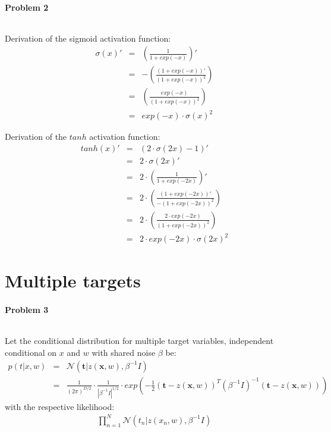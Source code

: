 \documentclass{article}
\renewcommand{\Vec}[1]{\ensuremath{\mathbf{#1}}}
\begin{document}
\paragraph*{Problem 2}
$\;$

Derivation of the sigmoid activation function:
\begin{eqnarray}
\sigma(x)' &=& \left( \frac{1}{1 + exp(-x)} \right)' \\
&=& -\left( \frac{(1 + exp(-x))'}{(1 + exp(-x))^2} \right)\\
&=& \left( \frac{exp(-x)}{(1 + exp(-x))^2} \right)\\
&=& exp(-x) \cdot \sigma(x)^2
\end{eqnarray}

Derivation of the $tanh$ activation function:
\begin{eqnarray}
tanh(x)' &=& (2 \cdot \sigma(2x) -1)'\\
&=& 2 \cdot \sigma(2x)' \\
&=& 2 \cdot \left( \frac{1}{1 + exp(-2x)} \right)' \\
&=& 2 \cdot \left( \frac{(1 + exp(-2x))'}{-(1 + exp(-2x))^2} \right)\\
&=& 2 \cdot \left( \frac{2 \cdot exp(-2x)}{(1 + exp(-2x))^2} \right)\\
&=& 2 \cdot exp(-2x) \cdot \sigma(2x)^2
\end{eqnarray}

\section{Multiple targets}

\paragraph*{Problem 3}
$\;$ 

Let the conditional distribution for multiple target variables, independent conditional on $x$ and $w$ with shared noise $\beta$ be:
\begin{eqnarray}
p(t | x,w) &=& \mathcal{N}(\Vec{t} | z(\Vec{x},w), \beta^{-1}I)\\
&=& \frac{1}{(2\pi)^{D/2}}\cdot \frac{1}{|\beta^{-1}I |^{1/2}}\cdot exp \left( -\frac{1}{2} (\Vec{t}-z(\Vec{x},w))^T(\beta^{-1}I)^{-1}(\Vec{t}-z(\Vec{x},w))\right)
\end{eqnarray}
with the respective likelihood:
\begin{eqnarray}
\prod_{n=1}^N\mathcal{N}(t_n | z(x_n,w), \beta^{-1}I)
\end{eqnarray}
\end{document}
